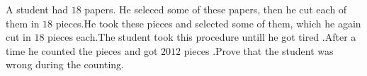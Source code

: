 A student had $18$ papers. He seleced some of these papers, then he cut each of them in $18$ pieces.He took these pieces and selected some of them, which he again cut in $18$ pieces each.The student took this procedure untill he got tired .After a time he counted the pieces and got $2012$ pieces .Prove that the student was wrong during the counting.